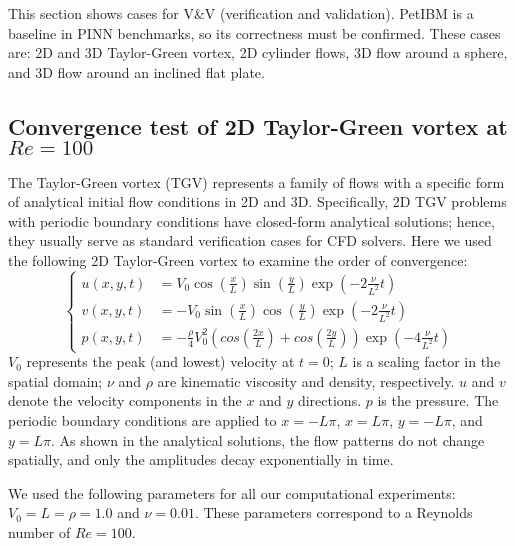 This section shows cases for V\&V (verification and validation).
PetIBM is a baseline in PINN benchmarks, so its correctness must be confirmed.
These cases are: 2D and 3D Taylor\hyp{}Green vortex, 2D cylinder flows, 3D flow around a sphere, and 3D flow around an inclined flat plate.

\subsection*{Convergence test of 2D Taylor-Green vortex at $Re=100$}

The Taylor-Green vortex (TGV) represents a family of flows with a specific form of analytical initial flow conditions in 2D and 3D.
Specifically, 2D TGV problems with periodic boundary conditions have closed-form analytical solutions; hence, they usually serve as standard verification cases for CFD solvers. 
Here we used the following 2D Taylor-Green vortex to examine the order of convergence:
\begin{equation}\label{eq:tgv}
    \left\{
        \begin{aligned}
            u(x, y, t) &= V_0\cos(\frac{x}{L})\sin(\frac{y}{L})\exp(-2\frac{\nu}{L^2}t) \\
            v(x, y, t) &= - V_0 \sin(\frac{x}{L})\cos(\frac{y}{L})\exp(-2\frac{\nu}{L^2}t) \\
            p(x, y, t) &= -\frac{\rho}{4}V_0^2\left(cos(\frac{2x}{L}) + cos(\frac{2y}{L})\right)\exp(-4\frac{\nu}{L^2}t)
        \end{aligned}
    \right.
\end{equation}
$V_0$ represents the peak (and lowest) velocity at $t=0$;
$L$ is a scaling factor in the spatial domain;
$\nu$ and $\rho$ are kinematic viscosity and density, respectively.
$u$ and $v$ denote the velocity components in the $x$ and $y$ directions.
$p$ is the pressure.
The periodic boundary conditions are applied to $x=-L\pi$, $x=L\pi$, $y=-L\pi$, and $y=L\pi$.
As shown in the analytical solutions, the flow patterns do not change spatially, and only the amplitudes decay exponentially in time.

We used the following parameters for all our computational experiments: $V_0=L=\rho=1.0$ and $\nu=0.01$.
These parameters correspond to a Reynolds number of $Re=100$.

